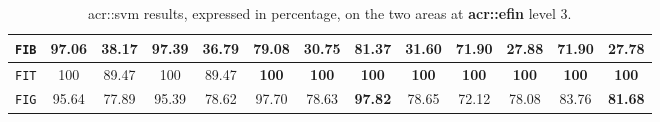 \begin{table}[htpb]
\begin{center}
\begin{tabular}{| c | c c | c c | c c | c c | c c | c c |}
                        \hline
                        \texttt{FIB} & 97.06 & \textbf{38.17} & \textbf{97.39} & 36.79 & 79.08 & 30.75 & 81.37 & 31.60 & 71.90 & 27.88 & 71.90 & 27.78 \\
                        \hline
                        \texttt{FIT} & 100 & 89.47 & 100 & 89.47 & \textbf{100} & \textbf{100} & \textbf{100} & \textbf{100} & \textbf{100} & \textbf{100} & \textbf{100} & \textbf{100} \\
                        \hline
                        \texttt{FIG} & 95.64 & 77.89 & 95.39 & 78.62 & 97.70 & 78.63 & \textbf{97.82} & 78.65 & 72.12 & 78.08 & 83.76 & \textbf{81.68} \\
                        \hline
                    \end{tabular}
                \end{center}
                \caption{
                    \label{tab::stats_scat_svm_f3}
                    \gls{acr::svm} results, expressed in percentage, on the two areas at \textbf{\gls{acr::efin}} level 3.
                }
            \end{table}

